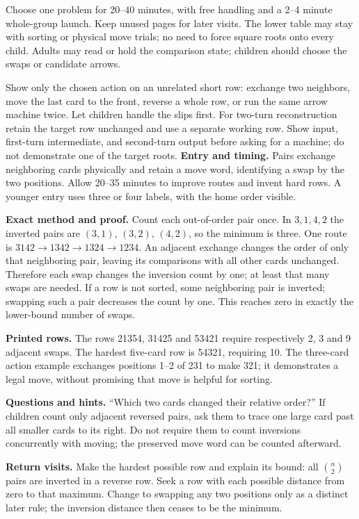 Choose one problem for 20--40 minutes, with free handling and a 2--4 minute whole-group launch. Keep unused pages for later visits. The lower table may stay with sorting or physical move trials; no need to force square roots onto every child. Adults may read or hold the comparison state; children should choose the swaps or candidate arrows.

Show only the chosen action on an unrelated short row: exchange two neighbors, move the last card to the front, reverse a whole row, or run the same arrow machine twice. Let children handle the slips first. For two-turn reconstruction retain the target row unchanged and use a separate working row. Show input, first-turn intermediate, and second-turn output before asking for a machine; do not demonstrate one of the target roots.
\newpage
{}
\textbf{Entry and timing.} Pairs exchange neighboring cards physically and retain a move word, identifying a swap by the two positions. Allow 20--35 minutes to improve routes and invent hard rows. A younger entry uses three or four labels, with the home order visible.

\textbf{Exact method and proof.} Count each out-of-order pair once. In $3,1,4,2$ the inverted pairs are $(3,1)$, $(3,2)$, $(4,2)$, so the minimum is three. One route is $3142\to\allowbreak 1342\to\allowbreak 1324\to\allowbreak 1234$. An adjacent exchange changes the order of only that neighboring pair, leaving its comparisons with all other cards unchanged. Therefore each swap changes the inversion count by one; at least that many swaps are needed. If a row is not sorted, some neighboring pair is inverted; swapping such a pair decreases the count by one. This reaches zero in exactly the lower-bound number of swaps.

\textbf{Printed rows.} The rows 21354, 31425 and 53421 require respectively 2, 3 and 9 adjacent swaps. The hardest five-card row is 54321, requiring 10. The three-card action example exchanges positions 1--2 of 231 to make 321; it demonstrates a legal move, without promising that move is helpful for sorting.

\textbf{Questions and hints.} ``Which two cards changed their relative order?'' If children count only adjacent reversed pairs, ask them to trace one large card past all smaller cards to its right. Do not require them to count inversions concurrently with moving; the preserved move word can be counted afterward.

\textbf{Return visits.} Make the hardest possible row and explain its bound: all $\binom n 2$ pairs are inverted in a reverse row. Seek a row with each possible distance from zero to that maximum. Change to swapping any two positions only as a distinct later rule; the inversion distance then ceases to be the minimum.

